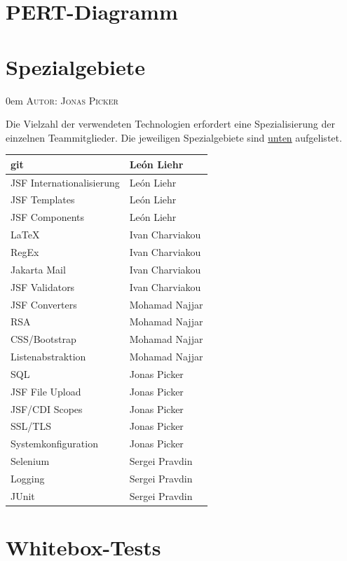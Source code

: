 \documentclass{article}
\makeatletter
\newcommand{\sectionauthor}[1]{
	{\parindent 0em \large \scshape Autor: #1 \par \nobreak \vspace*{1em}}
	\@afterheading
}
\makeatother
\begin{document}
\section{PERT-Diagramm}


\section{Spezialgebiete}
\sectionauthor{Jonas Picker}
Die Vielzahl der verwendeten Technologien erfordert eine Spezialisierung der einzelnen Teammitglieder. Die jeweiligen Spezialgebiete sind \hyperlink{speziell}{unten} aufgelistet.
\begin{table}[H]
\centering
\hypertarget{speziell}{}
\begin{tabular}{| p{6cm} | p{6cm} |}
	\hline
     	git & León Liehr \\
     	\hline
     	JSF Internationalisierung & León Liehr \\
     	\hline
    	JSF Templates & León Liehr \\	
     	\hline
     	JSF Components & León Liehr \\
     	\hline
     	\hline
     	LaTeX & Ivan Charviakou \\
     	\hline
     	RegEx & Ivan Charviakou \\
     	\hline
     	Jakarta Mail & Ivan Charviakou \\
     	\hline
     	JSF Validators & Ivan Charviakou \\
     	\hline
     	\hline
     	JSF Converters & Mohamad Najjar \\
    	\hline
    	 RSA & Mohamad Najjar \\
    	\hline
    	 CSS/Bootstrap & Mohamad Najjar \\
     	\hline
     	Listenabstraktion & Mohamad Najjar \\
     	\hline
     	\hline
     	SQL & Jonas Picker \\
    	\hline
    	JSF File Upload & Jonas Picker \\
     	\hline
     	JSF/CDI Scopes & Jonas Picker \\
     	\hline
     	SSL/TLS & Jonas Picker \\
     	\hline
     	Systemkonfiguration & Jonas Picker \\
     	\hline
     	\hline
     	Selenium & Sergei Pravdin \\
     	\hline
     	Logging & Sergei Pravdin \\
     	\hline
     	JUnit & Sergei Pravdin \\
     	\hline
\end{tabular}
\end{table}

\section{Whitebox-Tests}
\end{document}
